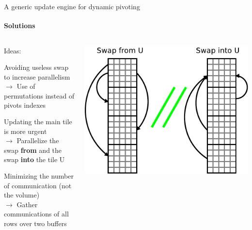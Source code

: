 \begin{frame}{A generic update engine for dynamic pivoting}
\framesubtitle{Solutions}
\begin{columns}
\begin{column}{.60\textwidth}
Ideas:
\begin{itemize}
{
\item Avoiding useless swap to increase parallelism\\
$\rightarrow$ Use of permutations instead of pivots indexes}
\item Updating the main tile is more urgent\\
$\rightarrow$ Parallelize the swap \textbf{from} and the swap \textbf{into} the tile U
\item Minimizing the number of communication (not the volume)\\
$\rightarrow$ Gather communications of all rows over two buffers
\end{itemize}
\end{column}
\begin{column}{.40\textwidth}
\begin{center}
\includegraphics[scale=0.3]{parswap.pdf}
\end{center}
\end{column}
\end{columns}
\end{frame}

